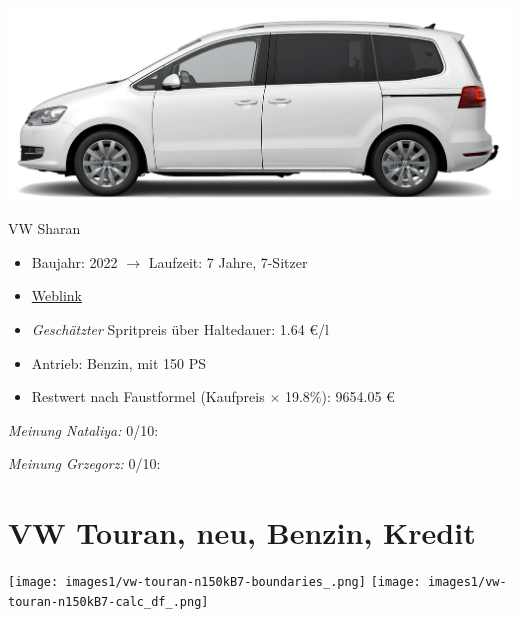 \documentclass[landscape, DIV=99, 14pt]{scrartcl}
\begin{document}
\pagebreak
\begin{center}
\includegraphics[width=0.9\columnwidth]{cars/vw-sharan.png}

VW Sharan
\end{center}

\begin{itemize}
    \item Baujahr: 2022 $\rightarrow$ Laufzeit: 7 Jahre, 7-Sitzer
    \item \href{https://www.volkswagen.de/de/konfigurator.html/__app/sharan/sharan/highline.app?buildabilityStatus-app=buildable&category-app=private&carlineId-app=31605&salesGroupId-app=32850&trimName-app=Highline&modelId-app=7N24GY%24GYOIYOI%24GYOUYOU&modelVersion-app=0&modelYear-app=2022&exteriorId-app=F14+0Q0Q&interiorId-app=F56+++++BY&options-app=GPF2PF2-GWBEWBE-GWG1WG1-GWH3WH3-GYOWYOW-MAHV1M6-MKSUKA2-MSSH4KF}{Weblink}
    \item \emph{Gesch\"atzter} Spritpreis \"uber Haltedauer: 1.64 \euro{}/l
    \item Antrieb: Benzin, mit 150 PS
    \item Restwert nach Faustformel (Kaufpreis $\times$ 19.8\%): 9654.05 \euro{}
\end{itemize}

\begin{small}
\emph{Meinung Nataliya:} 0/10: 
        
\emph{Meinung Grzegorz:} 0/10: 
\end{small}

\pagebreak


\twocolumn

\section*{VW Touran, neu, Benzin, Kredit}
\begin{center}
\texttt{[image: images1/vw-touran-n150kB7-boundaries\_.png]}
\null
\vspace{0.5cm}
\texttt{[image: images1/vw-touran-n150kB7-calc\_df\_.png]}
\end{center}
\end{document}
